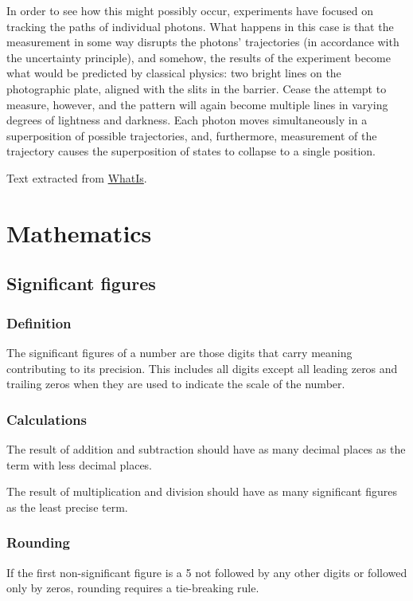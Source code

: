 \documentclass[oneside]{book} %
\theoremstyle{plain}
\begin{document}
In order to see how this might possibly occur, experiments have focused on
tracking the paths of individual photons. What happens in this case is that the
measurement in some way disrupts the photons' trajectories (in accordance with
the uncertainty principle), and somehow, the results of the experiment become
what would be predicted by classical physics: two bright lines on the
photographic plate, aligned with the slits in the barrier. Cease the attempt to
measure, however, and the pattern will again become multiple lines in varying
degrees of lightness and darkness. Each photon moves simultaneously in a
superposition of possible trajectories, and, furthermore, measurement of the
trajectory causes the superposition of states to collapse to a single position.

Text extracted from
\href{http://whatis.techtarget.com/definition/superposition}{WhatIs}.

\part{Mathematics}

\chapter{Significant figures}

\section{Definition}
The significant figures of a number are those digits that carry meaning
contributing to its precision. This includes all digits except all leading zeros
and trailing zeros when they are used to indicate the scale of the number.

\section{Calculations}
The result of addition and subtraction should have as many decimal places as the
term with less decimal places.

The result of multiplication and division should have as many significant
figures as the least precise term.

\section{Rounding}
If the first non-significant figure is a 5 not followed by any other digits or
followed only by zeros, rounding requires a tie-breaking rule.
\end{document}
